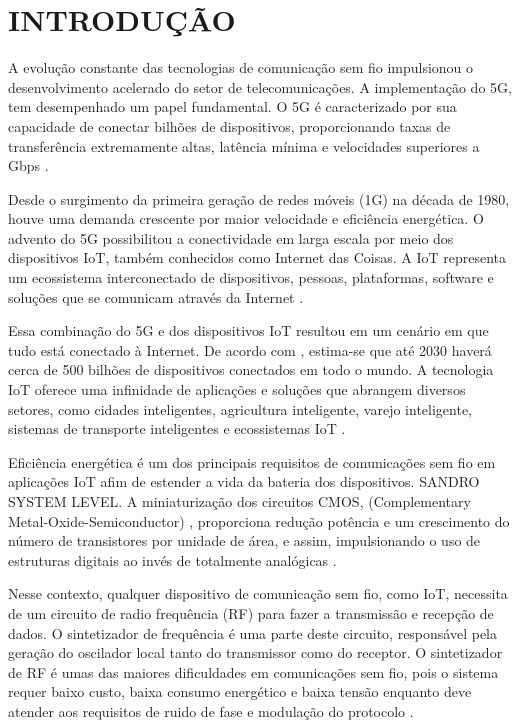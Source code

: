 \chapter{INTRODUÇÃO}\label{cap:introducao}
A evolução constante das tecnologias de comunicação sem fio impulsionou o desenvolvimento acelerado do setor de telecomunicações. A implementação do 5G, tem desempenhado um papel fundamental. O 5G é caracterizado por sua capacidade de conectar bilhões de dispositivos, proporcionando taxas de transferência extremamente altas, latência mínima e velocidades superiores a Gbps \cite{khanh2022wireless}.

Desde o surgimento da primeira geração de redes móveis (1G) na década de 1980, houve uma demanda crescente por maior velocidade e eficiência energética. O advento do 5G possibilitou a conectividade em larga escala por meio dos dispositivos IoT, também conhecidos como Internet das Coisas. A IoT representa um ecossistema interconectado de dispositivos, pessoas, plataformas, software e soluções que se comunicam através da Internet \cite{sinche2019survey}.

Essa combinação do 5G e dos dispositivos IoT resultou em um cenário em que tudo está conectado à Internet. De acordo com \cite{Cisco2020}, estima-se que até 2030 haverá cerca de 500 bilhões de dispositivos conectados em todo o mundo. A tecnologia IoT oferece uma infinidade de aplicações e soluções que abrangem diversos setores, como cidades inteligentes, agricultura inteligente, varejo inteligente, sistemas de transporte inteligentes e ecossistemas IoT \cite{khanh2022wireless}.

Eficiência energética é um dos principais requisitos de comunicações sem fio em aplicações IoT afim de estender a vida da bateria dos dispositivos. {SANDRO SYSTEM LEVEL}. A miniaturização dos circuitos CMOS, (Complementary Metal-Oxide-Semiconductor) \cite{khan2021nanoscale}, proporciona redução potência e um crescimento do número de transistores por unidade de área, e assim, impulsionando o uso de estruturas digitais ao invés de totalmente analógicas \cite{ferreira2020review}. 

Nesse contexto, qualquer dispositivo de comunicação sem fio, como IoT, necessita de um circuito de radio frequência (RF) para fazer a transmissão e recepção de dados. O sintetizador de frequência é uma parte deste circuito, responsável pela geração do oscilador local tanto do transmissor como do receptor. O sintetizador de RF é umas das maiores dificuldades em comunicações sem fio, pois o sistema requer baixo custo, baixa consumo energético e baixa tensão enquanto deve atender aos requisitos de ruido de fase e modulação do protocolo \cite{staszewski2006all}.

